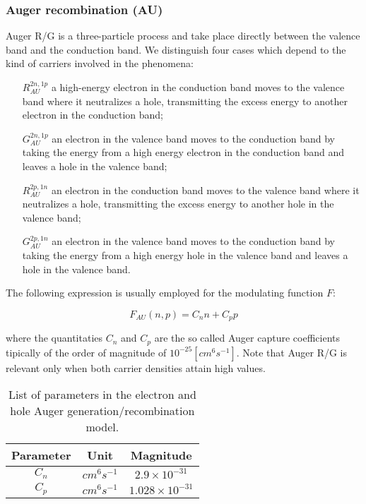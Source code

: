 \subsubsection{Auger recombination (AU)}

Auger R/G is a three-particle process and take place directly between the valence band and the conduction band. We distinguish four cases which depend to the kind of carriers involved in the phenomena:
\begin{itemize}
\item[$R_{AU}^{2n,1p}$] a high-energy electron in the conduction band moves to the valence band where it neutralizes a hole, transmitting the excess energy to another electron in the conduction band;
\item[$G_{AU}^{2n,1p}$] an electron in the valence band moves to the conduction band by taking the energy from a high energy electron in the conduction band and leaves a hole in the valence band;
\item[$R_{AU}^{2p,1n}$] an electron in the conduction band moves to the valence band where it neutralizes a hole, transmitting the excess energy to another hole in the valence band;
\item[$G_{AU}^{2p,1n}$] an electron in the valence band moves to the conduction band by taking the energy from a high energy hole in the valence band and leaves a hole in the valence band.
\end{itemize}

The following expression is usually employed for the modulating function $F$:

\begin{equation}
F_{AU}(n,p) = C_nn+C_pp
\end{equation}

where the quantitaties $C_n$ and $C_p$ are the so called  Auger capture coefficients tipically of the order of magnitude of $10^{-25}[cm^6s^{-1}]$.
Note that Auger R/G is relevant only when both carrier densities attain high values.

\begin{table}[!h]
\centering
\begin{tabular}{ccc}
\toprule
Parameter & Unit & Magnitude \\
\midrule
$C_n$ & $cm^6s^{-1}$ & $2.9 \times 10^{-31}$ \\
$C_p$ & $cm^6s^{-1}$ & $1.028 \times 10^{-31}$ \\
\bottomrule
\end{tabular}
\caption{List of parameters in the electron and hole Auger generation/recombination model.}
\end{table}

